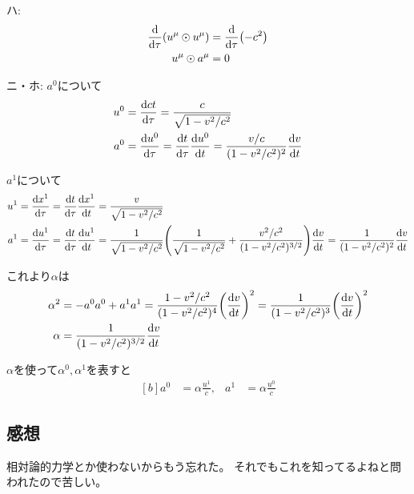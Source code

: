 \documentclass[../../sp_2015.tex]{subfiles}
\begin{document}
ハ:
\begin{equation}\begin{aligned}[b]
    \dv{\tau} (u^\mu\odot u^\mu) &= \dv{\tau}(-c^2)\\
        u^\mu\odot a^\mu &= 0
\end{aligned}\end{equation}

ニ・ホ:
\(a^0\)について
\begin{equation}\begin{aligned}[b]
    u^0 &= \dv{ct}{\tau} =\frac{c}{\sqrt{1-v^2/c^2}}\\
    a^0 &= \dv{u^0}{\tau} = \dv{t}{\tau}\dv{u^0}{t}
        = \frac{v/c}{(1-v^2/c^2)^{2}}\dv{v}{t}
\end{aligned}\end{equation}

\(a^1\)について
\begin{equation}\begin{aligned}[b]
    u^1 &= \dv{x^1}{\tau} = \dv{t}{\tau}\dv{x^1}{t} = \frac{v}{\sqrt{1-v^2/c^2}}\\
    a^1 &= \dv{u^1}{\tau} = \dv{t}{\tau}\dv{u^1}{t}
        = \frac{1}{\sqrt{1-v^2/c^2}}\qty(\frac{1}{\sqrt{1-v^2/c^2}}+\frac{v^2/c^2}{(1-v^2/c^2)^{3/2}})\dv{v}{t}
        = \frac{1}{(1-v^2/c^2)^2}\dv{v}{t}
\end{aligned}\end{equation}

これより\(\alpha\)は
\begin{equation}\begin{aligned}[b]
    \alpha^2 &= -a^0a^0+a^1a^1
    = \frac{1-v^2/c^2}{(1-v^2/c^2)^4}\qty(\dv{v}{t})^2
    = \frac{1}{(1-v^2/c^2)^3}\qty(\dv{v}{t})^2\\
    \alpha &= \frac{1}{(1-v^2/c^2)^{3/2}}\dv{v}{t}
\end{aligned}\end{equation}

\(\alpha\)を使って\(\alpha^0,\alpha^1\)を表すと
\begin{equation}\begin{aligned}[b]
    a^0 &= \alpha \frac{u^1}{c}, &
    a^1 &= \alpha \frac{u^0}{c}
\end{aligned}\end{equation}


\subsection*{感想}
相対論的力学とか使わないからもう忘れた。
それでもこれを知ってるよねと問われたので苦しい。
\end{document}
